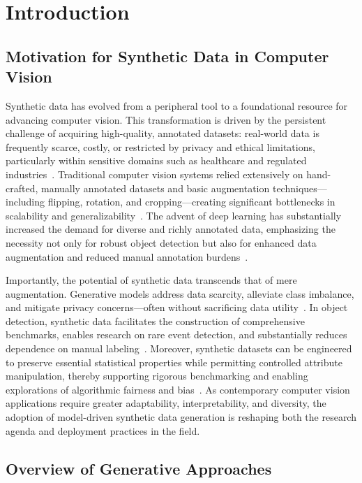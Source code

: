 \documentclass[sigconf]{acmart}
\begin{document}
\section{Introduction}

\subsection{Motivation for Synthetic Data in Computer Vision}

Synthetic data has evolved from a peripheral tool to a foundational resource for advancing computer vision. This transformation is driven by the persistent challenge of acquiring high-quality, annotated datasets: real-world data is frequently scarce, costly, or restricted by privacy and ethical limitations, particularly within sensitive domains such as healthcare and regulated industries~\cite{ref12,ref21,ref22,ref33,ref35,ref43,ref87}. Traditional computer vision systems relied extensively on hand-crafted, manually annotated datasets and basic augmentation techniques—including flipping, rotation, and cropping—creating significant bottlenecks in scalability and generalizability~\cite{ref49,ref61,ref62,ref65}. The advent of deep learning has substantially increased the demand for diverse and richly annotated data, emphasizing the necessity not only for robust object detection but also for enhanced data augmentation and reduced manual annotation burdens~\cite{ref35,ref43,ref49,ref61,ref62,ref64,ref65}.

Importantly, the potential of synthetic data transcends that of mere augmentation. Generative models address data scarcity, alleviate class imbalance, and mitigate privacy concerns—often without sacrificing data utility~\cite{ref33,ref35,ref43}. In object detection, synthetic data facilitates the construction of comprehensive benchmarks, enables research on rare event detection, and substantially reduces dependence on manual labeling~\cite{ref49,ref61}. Moreover, synthetic datasets can be engineered to preserve essential statistical properties while permitting controlled attribute manipulation, thereby supporting rigorous benchmarking and enabling explorations of algorithmic fairness and bias~\cite{ref12,ref14}. As contemporary computer vision applications require greater adaptability, interpretability, and diversity, the adoption of model-driven synthetic data generation is reshaping both the research agenda and deployment practices in the field.

\subsection{Overview of Generative Approaches}
\end{document}

